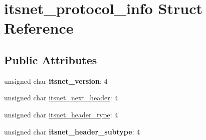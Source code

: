 \hypertarget{structitsnet__protocol__info}{\section{itsnet\-\_\-protocol\-\_\-info \-Struct \-Reference}
\label{structitsnet__protocol__info}
}
\subsection*{\-Public \-Attributes}
\begin{DoxyCompactItemize}
\item 
\hypertarget{structitsnet__protocol__info_a98e7814d21f224573c580330ee344fa5}{unsigned char {\bfseries itsnet\-\_\-version}\-: 4}\label{structitsnet__protocol__info_a98e7814d21f224573c580330ee344fa5}

\item 
unsigned char \hyperlink{structitsnet__protocol__info_ae4adf5c9cf449706a27b57df3c064147}{itsnet\-\_\-next\-\_\-header}\-: 4
\item 
unsigned char \hyperlink{structitsnet__protocol__info_ab51f33d251bae7f209e7047572450a06}{itsnet\-\_\-header\-\_\-type}\-: 4
\item 
\hypertarget{structitsnet__protocol__info_acbc45f15786f85f75f05f249965385c2}{unsigned char {\bfseries itsnet\-\_\-header\-\_\-subtype}\-: 4}\label{structitsnet__protocol__info_acbc45f15786f85f75f05f249965385c2}

\end{DoxyCompactItemize}


